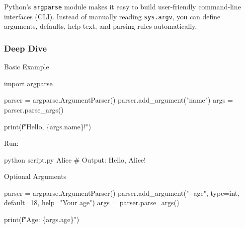 \documentclass[
  letterpaper,
  DIV=11,
  numbers=noendperiod]{scrreprt}
\newenvironment{Shaded}{\begin{snugshade}}{\end{snugshade}}
\newcommand{\BuiltInTok}[1]{\textcolor[rgb]{0.00,0.23,0.31}{#1}}
\newcommand{\CommentTok}[1]{\textcolor[rgb]{0.37,0.37,0.37}{#1}}
\newcommand{\DecValTok}[1]{\textcolor[rgb]{0.68,0.00,0.00}{#1}}
\newcommand{\ExtensionTok}[1]{\textcolor[rgb]{0.00,0.23,0.31}{#1}}
\newcommand{\ImportTok}[1]{\textcolor[rgb]{0.00,0.46,0.62}{#1}}
\newcommand{\NormalTok}[1]{\textcolor[rgb]{0.00,0.23,0.31}{#1}}
\newcommand{\OperatorTok}[1]{\textcolor[rgb]{0.37,0.37,0.37}{#1}}
\newcommand{\SpecialCharTok}[1]{\textcolor[rgb]{0.37,0.37,0.37}{#1}}
\newcommand{\SpecialStringTok}[1]{\textcolor[rgb]{0.13,0.47,0.30}{#1}}
\newcommand{\StringTok}[1]{\textcolor[rgb]{0.13,0.47,0.30}{#1}}
\begin{document}
Python's \texttt{argparse} module makes it easy to build user-friendly
command-line interfaces (CLI). Instead of manually reading
\texttt{sys.argv}, you can define arguments, defaults, help text, and
parsing rules automatically.

\subsubsection{Deep Dive}\label{deep-dive-96}

Basic Example

\begin{Shaded}
\begin{Highlighting}[]
\ImportTok{import}\NormalTok{ argparse}

\NormalTok{parser }\OperatorTok{=}\NormalTok{ argparse.ArgumentParser()}
\NormalTok{parser.add\_argument(}\StringTok{"name"}\NormalTok{)}
\NormalTok{args }\OperatorTok{=}\NormalTok{ parser.parse\_args()}

\BuiltInTok{print}\NormalTok{(}\SpecialStringTok{f"Hello, }\SpecialCharTok{\{}\NormalTok{args}\SpecialCharTok{.}\NormalTok{name}\SpecialCharTok{\}}\SpecialStringTok{!"}\NormalTok{)}
\end{Highlighting}
\end{Shaded}

Run:

\begin{Shaded}
\begin{Highlighting}[]
\ExtensionTok{python}\NormalTok{ script.py Alice}
\CommentTok{\# Output: Hello, Alice!}
\end{Highlighting}
\end{Shaded}

Optional Arguments

\begin{Shaded}
\begin{Highlighting}[]
\NormalTok{parser }\OperatorTok{=}\NormalTok{ argparse.ArgumentParser()}
\NormalTok{parser.add\_argument(}\StringTok{"{-}{-}age"}\NormalTok{, }\BuiltInTok{type}\OperatorTok{=}\BuiltInTok{int}\NormalTok{, default}\OperatorTok{=}\DecValTok{18}\NormalTok{, }\BuiltInTok{help}\OperatorTok{=}\StringTok{"Your age"}\NormalTok{)}
\NormalTok{args }\OperatorTok{=}\NormalTok{ parser.parse\_args()}

\BuiltInTok{print}\NormalTok{(}\SpecialStringTok{f"Age: }\SpecialCharTok{\{}\NormalTok{args}\SpecialCharTok{.}\NormalTok{age}\SpecialCharTok{\}}\SpecialStringTok{"}\NormalTok{)}
\end{Highlighting}
\end{Shaded}
\end{document}
